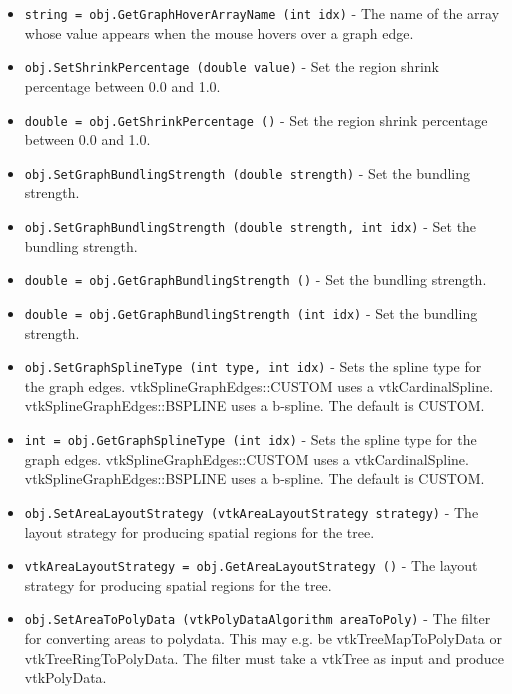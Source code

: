 \begin{itemize}
\item  \verb|string = obj.GetGraphHoverArrayName (int idx)| -  The name of the array whose value appears when the mouse hovers
 over a graph edge.

\item  \verb|obj.SetShrinkPercentage (double value)| -  Set the region shrink percentage between 0.0 and 1.0.

\item  \verb|double = obj.GetShrinkPercentage ()| -  Set the region shrink percentage between 0.0 and 1.0.

\item  \verb|obj.SetGraphBundlingStrength (double strength)| -  Set the bundling strength.

\item  \verb|obj.SetGraphBundlingStrength (double strength, int idx)| -  Set the bundling strength.

\item  \verb|double = obj.GetGraphBundlingStrength ()| -  Set the bundling strength.

\item  \verb|double = obj.GetGraphBundlingStrength (int idx)| -  Set the bundling strength.

\item  \verb|obj.SetGraphSplineType (int type, int idx)| -  Sets the spline type for the graph edges.
 vtkSplineGraphEdges::CUSTOM uses a vtkCardinalSpline.
 vtkSplineGraphEdges::BSPLINE uses a b-spline.
 The default is CUSTOM.

\item  \verb|int = obj.GetGraphSplineType (int idx)| -  Sets the spline type for the graph edges.
 vtkSplineGraphEdges::CUSTOM uses a vtkCardinalSpline.
 vtkSplineGraphEdges::BSPLINE uses a b-spline.
 The default is CUSTOM.

\item  \verb|obj.SetAreaLayoutStrategy (vtkAreaLayoutStrategy strategy)| -  The layout strategy for producing spatial regions for the tree.

\item  \verb|vtkAreaLayoutStrategy = obj.GetAreaLayoutStrategy ()| -  The layout strategy for producing spatial regions for the tree.

\item  \verb|obj.SetAreaToPolyData (vtkPolyDataAlgorithm areaToPoly)| -  The filter for converting areas to polydata. This may e.g. be
 vtkTreeMapToPolyData or vtkTreeRingToPolyData.
 The filter must take a vtkTree as input and produce vtkPolyData.


\end{itemize}
